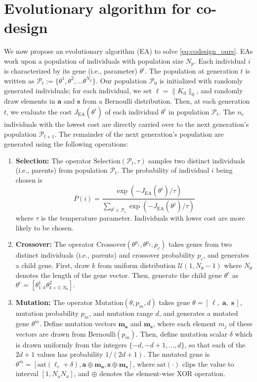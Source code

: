 \documentclass[letterpaper, 10pt, conference]{ieeeconf}
\begin{document}
\section{Evolutionary algorithm for co-design} \label{sec:ea}

We now propose an evolutionary algorithm (EA) to solve \eqref{eq:codesign_ours}. EAs work upon a population of individuals with population size $N_p$. Each individual $i$ is characterized by its gene (i.e., parameter) $\theta^i$. The population at generation $t$ is written as $\mathcal{P}_t := \{\theta^1, \theta^2, \ldots \theta^{N_p} \}$. Our population $\mathcal{P}_0$ is initialized with randomly generated individuals; for each individual, we set $\ell = \|K_{\mathrm{d}}\|_0$, and randomly draw elements in $\mathbf{a}$ and $\mathbf{s}$ from a Bernoulli distribution. Then, at each generation $t$, we evaluate the cost $J_\mathrm{EA}(\theta^i)$ of each individual $\theta^i$ in population $\mathcal{P}_t$. The $n_e$ individuals with the lowest cost are directly carried over to the next generation's population $\mathcal{P}_{t+1}$. The remainder of the next generation's population are generated using the following operations:
\begin{enumerate}
    \item \textbf{Selection:} The operator $\text{Selection}(\mathcal{P}_t, \tau)$ samples two distinct individuals (i.e., parents) from population $\mathcal{P}_t$. The probability of individual $i$ being chosen is
    \begin{equation}
    P(i) = \frac{\exp(-J_\mathrm{EA}(\theta^i)/\tau)}{\sum_{\theta^j \in \mathcal{P}_t} \exp(-J_\mathrm{EA}(\theta^j)/\tau)}\end{equation}
    where $\tau$ is the temperature parameter. Individuals with lower cost are more likely to be chosen.

    \item \textbf{Crossover:} The operator $\text{Crossover}(\theta^{p_1}, \theta^{p_2}, p_c)$ takes genes from two distinct individuals (i.e., parents) and crossover probability $p_c$, and generates a child gene. First, draw $k$ from uniform distribution $\mathcal{U}(1, N_\theta-1)$ where $N_\theta$ denotes the length of the gene vector. Then, generate the child gene $\theta^c$ as
    $\theta^c = [\theta^1_{1:k} \theta^2_{k+1:N_\theta}]$.

    \item \textbf{Mutation:} The operator $\text{Mutation}(\theta, p_m, d)$ takes gene $\theta = [\,\ell, \;\mathbf{a}, \;\mathbf{s}\,]$, mutation probability $p_m$, and mutation range $d$, and generates a mutated gene $\theta^m$. Define mutation vectors $\mathbf{m_a}$ and $\mathbf{m_s}$, where each element $m_j$ of these vectors are drawn from $\text{Bernoulli}(p_m)$. Then, define mutation scalar $\delta$ which is drawn uniformly from the integers $\{-d, -d+1, \ldots, d\}$, so that each of the $2d+1$ values has probability $1/(2d+1)$. The mutated gene is $\theta^m = [\mathrm{sat}(\ell_c + \delta), \mathbf{a} \oplus \mathbf{m_a}, \mathbf{s} \oplus \mathbf{m_s}]$, where $\mathrm{sat}(\cdot)$ clips the value to interval $[1, N_u N_x]$, and $\oplus$ denotes the element-wise XOR operation.
\end{enumerate}
\end{document}
